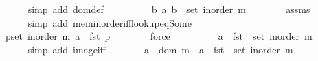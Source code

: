 \begin{isabellebody}
\ \ \ \ \ \ \isamarkupfalse%
\ {\isacharparenleft}{\kern0pt}simp\ add{\isacharcolon}{\kern0pt}\ dom{\isacharunderscore}{\kern0pt}def{\isacharparenright}{\kern0pt}\isanewline
\ \ \ \ \isamarkupfalse%
\ \isamarkupfalse%
\ {\isachardoublequoteopen}{\isachardot}{\kern0pt}{\isachardot}{\kern0pt}{\isachardot}{\kern0pt}\ {\isasymlongleftrightarrow}\ {\isacharparenleft}{\kern0pt}{\isasymexists}b{\isachardot}{\kern0pt}\ {\isacharparenleft}{\kern0pt}a{\isacharcomma}{\kern0pt}\ b{\isacharparenright}{\kern0pt}\ {\isasymin}\ set\ {\isacharparenleft}{\kern0pt}inorder\ m{\isacharparenright}{\kern0pt}{\isacharparenright}{\kern0pt}{\isachardoublequoteclose}\isanewline
\ \ \ \ \ \ \isamarkupfalse%
\ assms\isanewline
\ \ \ \ \ \ \isamarkupfalse%
\ {\isacharparenleft}{\kern0pt}simp\ add{\isacharcolon}{\kern0pt}\ mem{\isacharunderscore}{\kern0pt}inorder{\isacharunderscore}{\kern0pt}iff{\isacharunderscore}{\kern0pt}lookup{\isacharunderscore}{\kern0pt}eq{\isacharunderscore}{\kern0pt}Some{\isacharparenright}{\kern0pt}\isanewline
\ \ \ \ \isamarkupfalse%
\ \isamarkupfalse%
\ {\isachardoublequoteopen}{\isachardot}{\kern0pt}{\isachardot}{\kern0pt}{\isachardot}{\kern0pt}\ {\isasymlongleftrightarrow}\ {\isacharparenleft}{\kern0pt}{\isasymexists}p{\isasymin}set\ {\isacharparenleft}{\kern0pt}inorder\ m{\isacharparenright}{\kern0pt}{\isachardot}{\kern0pt}\ a\ {\isacharequal}{\kern0pt}\ fst\ p{\isacharparenright}{\kern0pt}{\isachardoublequoteclose}\isanewline
\ \ \ \ \ \ \isamarkupfalse%
\ force\isanewline
\ \ \ \ \isamarkupfalse%
\ \isamarkupfalse%
\ {\isachardoublequoteopen}{\isachardot}{\kern0pt}{\isachardot}{\kern0pt}{\isachardot}{\kern0pt}\ {\isasymlongleftrightarrow}\ a\ {\isasymin}\ fst\ {\isacharbackquote}{\kern0pt}\ set\ {\isacharparenleft}{\kern0pt}inorder\ m{\isacharparenright}{\kern0pt}{\isachardoublequoteclose}\isanewline
\ \ \ \ \ \ \isamarkupfalse%
\ {\isacharparenleft}{\kern0pt}simp\ add{\isacharcolon}{\kern0pt}\ image{\isacharunderscore}{\kern0pt}iff{\isacharparenright}{\kern0pt}\isanewline
\ \ \ \ \isamarkupfalse%
\ \isamarkupfalse%
\ {\isachardoublequoteopen}a\ {\isasymin}\ dom\ m\ {\isasymlongleftrightarrow}\ a\ {\isasymin}\ fst\ {\isacharbackquote}{\kern0pt}\ set\ {\isacharparenleft}{\kern0pt}inorder\ m{\isacharparenright}{\kern0pt}{\isachardoublequoteclose}\isanewline
\ \ \ \ \ \ \isacommand{{\isachardot}{\kern0pt}}\isamarkupfalse%
\ \isacommand{{\isacharbraceright}{\kern0pt}}\isamarkupfalse%

\end{isabellebody}
